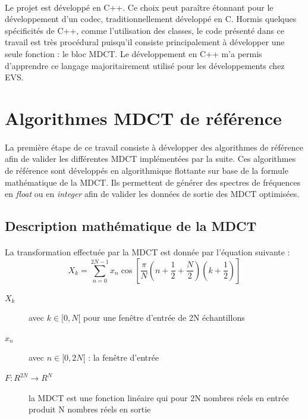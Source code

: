 \documentclass{article}
\begin{document}
    \paragraph{}
    Le projet est développé en C++. Ce choix peut paraître étonnant pour le développement d'un codec, traditionnellement développé en C. Hormis quelques spécificités de C++, comme l'utilisation des classes, le code présenté dans ce travail est très procédural puisqu'il consiste principalement à développer une seule fonction : le bloc MDCT. Le développement en C++ m'a permis d'apprendre ce langage majoritairement utilisé pour les développements chez EVS.



    \newpage
    \section{Algorithmes MDCT de référence}

    \paragraph{}
    La première étape de ce travail consiste à développer des algorithmes de référence afin de valider les différentes MDCT implémentées par la suite. Ces algorithmes de référence sont développés en algorithmique flottante sur base de la formule mathématique de la MDCT. Ils permettent de générer des spectres de fréquences en \emph{float} ou en \emph{integer} afin de valider les données de sortie des MDCT optimisées.


    \subsection{Description mathématique de la MDCT}
    \label{sec:desc-math}

    \paragraph{}
    La transformation effectuée par la MDCT est donnée par l'équation suivante\cite{wiki:MDCT} :
    $$X_k = \sum_{n=0}^{2N-1} x_n \cos \left[ \frac{\pi}{N} \left( n + \frac{1}{2} + \frac{N}{2} \right) \left( k + \frac{1}{2} \right) \right]$$
    \begin{description}
        \item[$X_k$] avec $k \in [0, N[$ pour une fenêtre d'entrée de 2N échantillons
        \item[$x_n$] avec $n \in [0, 2N[$ : la fenêtre d'entrée
        \item[$F: R^{2N} \rightarrow R^N$] la MDCT est une fonction linéaire qui pour 2N nombres réels en entrée produit N nombres réels en sortie
    \end{description}\label{test}
\end{document}
